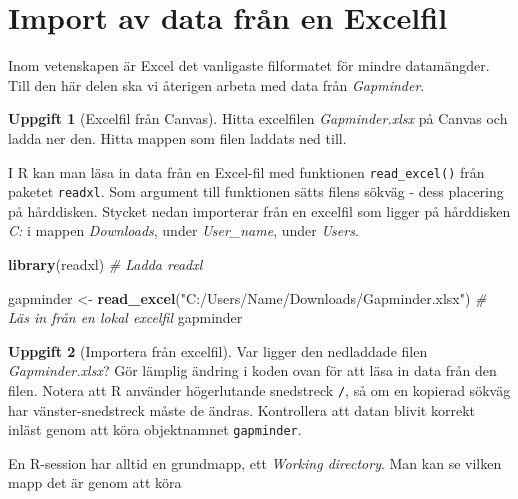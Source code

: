 \documentclass[
]{book}
\newenvironment{Shaded}{\begin{snugshade}}{\end{snugshade}}
\newcommand{\CommentTok}[1]{\textcolor[rgb]{0.56,0.35,0.01}{\textit{#1}}}
\newcommand{\FunctionTok}[1]{\textcolor[rgb]{0.13,0.29,0.53}{\textbf{#1}}}
\newcommand{\NormalTok}[1]{#1}
\newcommand{\OtherTok}[1]{\textcolor[rgb]{0.56,0.35,0.01}{#1}}
\newcommand{\StringTok}[1]{\textcolor[rgb]{0.31,0.60,0.02}{#1}}
\theoremstyle{definition}
\theoremstyle{definition}
\theoremstyle{definition}
\newtheorem{exercise}{Uppgift}[chapter]
\theoremstyle{definition}
\theoremstyle{remark}
\begin{document}
\section{Import av data från en Excelfil}\label{import-av-data-fruxe5n-en-excelfil}

Inom vetenskapen är Excel det vanligaste filformatet för mindre datamängder. Till den här delen ska vi återigen arbeta med data från \emph{Gapminder}.

\begin{exercise}[Excelfil från Canvas]
Hitta excelfilen \emph{Gapminder.xlsx} på Canvas och ladda ner den. Hitta mappen som filen laddats ned till.
\end{exercise}

I R kan man läsa in data från en Excel-fil med funktionen \texttt{read\_excel()} från paketet \texttt{readxl}. Som argument till funktionen sätts filens sökväg - dess placering på hårddisken. Stycket nedan importerar från en excelfil som ligger på hårddisken \emph{C:} i mappen \emph{Downloads}, under \emph{User\_name}, under \emph{Users}.

\begin{Shaded}
\begin{Highlighting}[]
\FunctionTok{library}\NormalTok{(readxl)  }\CommentTok{\# Ladda readxl}
\end{Highlighting}
\end{Shaded}

\begin{Shaded}
\begin{Highlighting}[]
\NormalTok{gapminder }\OtherTok{\textless{}{-}} \FunctionTok{read\_excel}\NormalTok{(}\StringTok{"C:/Users/Name/Downloads/Gapminder.xlsx"}\NormalTok{)}
\CommentTok{\# Läs in från en lokal excelfil}
\NormalTok{gapminder}
\end{Highlighting}
\end{Shaded}

\begin{exercise}[Importera från excelfil]
Var ligger den nedladdade filen \emph{Gapminder.xlsx}? Gör lämplig ändring i koden ovan för att läsa in data från den filen. Notera att R använder högerlutande snedstreck \texttt{/}, så om en kopierad sökväg har vänster-snedstreck måste de ändras. Kontrollera att datan blivit korrekt inläst genom att köra objektnamnet \texttt{gapminder}.
\end{exercise}

En R-session har alltid en grundmapp, ett \emph{Working directory}. Man kan se vilken mapp det är genom att köra
\end{document}
